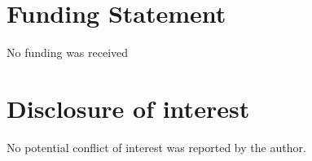 \documentclass{rQUF2e}
\begin{document}
    

    

    

    

    

    

    \section*{Funding Statement}
    \label{sec:funding}
    No funding was received

    \section*{Disclosure of interest}
    \label{sec:disclosure}
    No potential conflict of interest was reported by the author.

    
    
\end{document}
